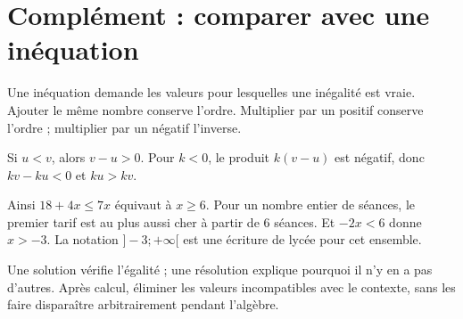 \documentclass[../cours_3e.tex]{subfiles}
\begin{document}
\section{Complément : comparer avec une inéquation}
\approfondissement Une inéquation demande les valeurs pour lesquelles une inégalité est vraie. Ajouter le même nombre conserve l'ordre. Multiplier par un positif conserve l'ordre ; multiplier par un négatif l'inverse.
\begin{demonstration}
Si $u<v$, alors $v-u>0$. Pour $k<0$, le produit $k(v-u)$ est négatif, donc $kv-ku<0$ et $ku>kv$.
\end{demonstration}
Ainsi $18+4x\leq7x$ équivaut à $x\geq6$. Pour un nombre entier de séances, le premier tarif est au plus aussi cher à partir de $6$ séances.
Et $-2x<6$ donne $x>-3$. La notation $]-3;+\infty[$ est une écriture de lycée pour cet ensemble.
\begin{retenir}
Une solution vérifie l'égalité ; une résolution explique pourquoi il n'y en a pas d'autres. Après calcul, éliminer les valeurs incompatibles avec le contexte, sans les faire disparaître arbitrairement pendant l'algèbre.
\end{retenir}
\end{document}
